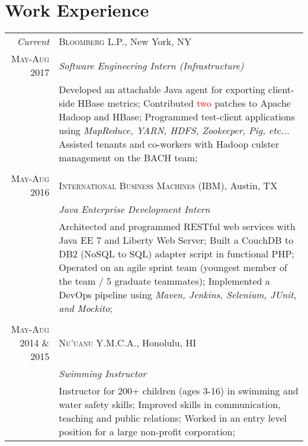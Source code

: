 \documentclass[a4paper,10pt]{article}
\begin{document}
\section{Work Experience}
\begin{tabular}{r|p{11cm}}

\emph{Current} & \textsc{\color{medRed}Bloomberg L.P.}, New York, NY \\
\textsc{May-Aug 2017}&\emph{Software Engineering Intern (Infrastructure)} \\
&\footnotesize{
Developed an attachable Java agent for exporting client-side HBase metrics; \newline
Contributed \textcolor{red}{two} patches to Apache Hadoop and HBase; \newline
Programmed test-client applications using \textit{MapReduce, YARN, HDFS, Zookeeper, Pig, etc...} \newline 
Assisted tenants and co-workers with Hadoop culster management on the BACH team; 
}\\\multicolumn{2}{c}{} \\

\textsc{May-Aug 2016} & \textsc{\color{medRed}International Business Machines (IBM)}, Austin, TX \\
&\emph{Java Enterprise Development Intern} \\
&\footnotesize{
Architected and programmed RESTful web services with Java EE 7 and Liberty Web Server; \newline
Built a CouchDB to DB2 (NoSQL to SQL) adapter script in functional PHP; \newline
Operated on an agile sprint team (youngest member of the team / 5 graduate teammates); \newline
Implemented a DevOps pipeline using \textit{Maven, Jenkins, Selenium, JUnit, and Mockito};  
}\\ \multicolumn{2}{c}{} \\

\textsc{May-Aug 2014 \& 2015} & \textsc{\color{medRed}Nu'uanu Y.M.C.A.}, Honolulu, HI \\
&\emph{Swimming Instructor} \\
&\footnotesize{
Instructor for 200+ children (ages 3-16) in swimming and water safety skills; \newline
Improved skills in communication, teaching and public relations; \newline
Worked in an entry level position for a large non-profit corporation; 
}\end{tabular}
\end{document}
